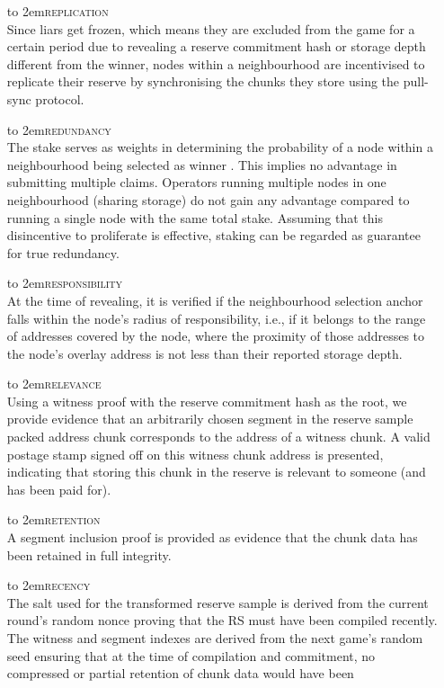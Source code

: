 \begin{itemize}[noitemsep]
%
\item[\hbox to 2em{\textsc{replication}}] \hspace{1cm}\\ Since liars get frozen, which means they are excluded from the game for a certain period due to revealing a reserve commitment hash or storage depth different from the winner, nodes within a neighbourhood are incentivised to replicate their reserve by synchronising the chunks they store using the pull-sync protocol.
%
\item[\hbox to 2em{\textsc{redundancy}}] \hspace{1cm}\\ The stake serves as weights in determining the probability of a node within a neighbourhood being selected as winner%
. This implies no advantage in submitting multiple claims. Operators running multiple nodes in one neighbourhood (sharing storage) do not gain any advantage compared to running a single node with the same total stake. Assuming that this disincentive to proliferate is effective, staking can be regarded as guarantee for true redundancy.
%
\item[\hbox to 2em{\textsc{responsibility}}] \hspace{1cm}\\  At the time of revealing, it is verified if the neighbourhood selection anchor falls within the node's radius of responsibility, i.e., if it belongs to the range of addresses covered by the node, where the proximity of those addresses to the node's overlay address is not less than their reported storage depth. 
%
\item[\hbox to 2em{\textsc{relevance}}] \hspace{1cm}\\ Using a witness proof with the reserve commitment hash as the root, we provide evidence that an arbitrarily chosen segment in the reserve sample packed address chunk corresponds to the address of a witness chunk. 
A valid postage stamp signed off on this witness chunk address is presented, indicating that storing this chunk in the reserve is relevant to someone (and has been paid for). 
\item[\hbox to 2em{\textsc{retention}}] \hspace{1cm}\\ A segment inclusion proof is provided as evidence that the chunk data has been retained in full integrity. 
\item[\hbox to 2em{\textsc{recency}}] \hspace{1cm}\\ The salt used for the transformed reserve sample is derived from the current round's random nonce proving that the RS must have been compiled recently. The witness and segment indexes are derived from the next game's random seed ensuring that at the time of compilation and commitment, no compressed or partial retention of chunk data would have been

\end{itemize}
